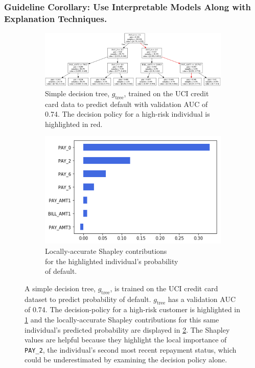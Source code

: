\documentclass[fleqn]{article}
\begin{document}
\subsubsection{Guideline Corollary: Use Interpretable Models Along with Explanation Techniques.}

\begin{figure}[ht!]
	\begin{subfigure}{.6\textwidth}
		\includegraphics[height=.45\linewidth, width=1.15\linewidth]{img/dt.png}
  		\caption{Simple decision tree, $g_{\text{tree}}$, trained on the UCI credit card data to predict default with validation AUC of 0.74. The decision policy for a high-risk individual is highlighted in red.}
  		\label{fig:dt}
	\end{subfigure}\hspace{50pt}
	\begin{subfigure}{.4\textwidth}
		\vspace{30pt}
  		\includegraphics[height=.5\linewidth, width=.8\linewidth]{img/shap.png}
  		\vspace{5pt}
  		\caption{Locally-accurate Shapley contributions\\ for the highlighted individual's probability\\ of default.}
  		\label{fig:shap}
	\end{subfigure}
	\caption{A simple decision tree, $g_{\text{tree}}$, is trained on the UCI credit card dataset to predict probability of default. $g_{\text{tree}}$ has a validation AUC of 0.74. The decision-policy for a high-risk customer is highlighted in \ref{fig:dt} and the locally-accurate Shapley contributions for this same individual's predicted probability are displayed in \ref{fig:shap}. The Shapley values are helpful because they highlight the local importance of \texttt{PAY\_2}, the individual's second most recent repayment status, which could be underestimated by examining the decision policy alone.}
	\label{fig:dt_shap}
\end{figure}
\end{document}
